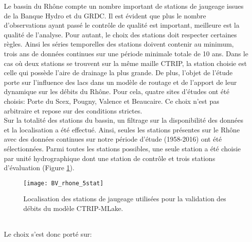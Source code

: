 Le bassin du Rhône compte un nombre important de stations de jaugeage issues de la Banque Hydro et du GRDC. Il est évident que plus le nombre d'observations ayant passé le contrôle de qualité est important, meilleure est la qualité de l'analyse. Pour autant, le choix des stations doit respecter certaines règles. Ainsi les séries temporelles des stations doivent contenir au minimum, trois ans de données continues sur une période minimale totale de 10 ans. Dans le cas où deux stations se trouvent sur la même maille CTRIP, la station choisie est celle qui possède l'aire de drainage la plus grande. De plus, l'objet de l'étude porte sur l'influence des lacs dans un modèle de routage et de l'apport de leur dynamique sur les débits du Rhône. Pour cela, quatre sites d'études ont été choisis: Porte du Scex, Pougny, Valence et Beaucaire. Ce choix n'est pas arbitraire et repose sur des conditions strictes.\\

\noindent Sur la totalité des stations du bassin, un filtrage sur la disponibilité des données et la localisation a été effectué. Ainsi, seules les stations présentes sur le Rhône avec des données continues sur notre période d'étude (1958-2016) ont été sélectionnées. Parmi toutes les stations possibles, une seule station a été choisie par unité hydrographique dont une station de contrôle et trois stations d'évaluation (Figure \ref{fig_5stat}). \\

\begin{figure}[h!]
\centering
\texttt{[image: BV\_rhone\_5stat]}
\caption{Localisation des stations de jaugeage utilisées pour la validation des débits du modèle CTRIP-MLake.}
\label{fig_5stat}
\end{figure}

~\\

Le choix s'est donc porté sur:\\

